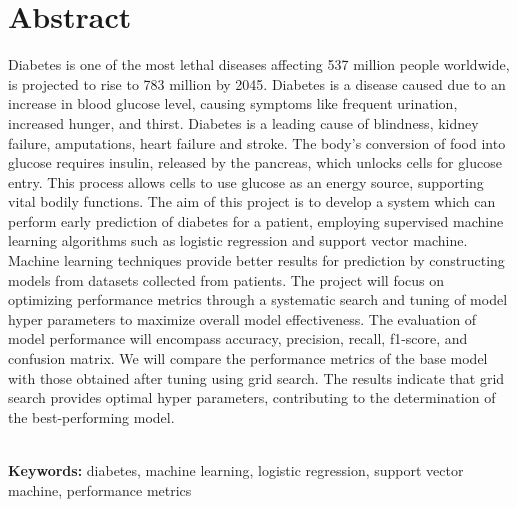 \chapter*{\center \Large  Abstract}

Diabetes is one of the most lethal diseases affecting 537 million people worldwide, is projected to rise to 783 million by 2045. Diabetes is a disease caused due to an increase in blood glucose level, causing symptoms like frequent urination, increased hunger, and thirst. Diabetes is a leading cause of blindness, kidney failure, amputations, heart failure and stroke. The body's conversion of food into glucose requires insulin, released by the pancreas, which unlocks cells for glucose entry. This process allows cells to use glucose as an energy source, supporting vital bodily functions. The aim of this project is to develop a system which can perform early prediction of diabetes for a patient, employing supervised machine learning algorithms such as logistic regression and support vector machine. Machine learning techniques provide better results for prediction by constructing models from datasets collected from patients. The project will focus on optimizing performance metrics through a systematic search and tuning of model hyper parameters to maximize overall model effectiveness. The evaluation of model performance will encompass accuracy, precision, recall, f1-score, and confusion matrix. We will compare the performance metrics of the base model with those obtained after tuning using grid search. The results indicate that grid search provides optimal hyper parameters, contributing to the determination of the best-performing model.



~\\[1cm]
\noindent %
\textbf{Keywords:} diabetes, machine learning, logistic regression, support vector machine, performance metrics

